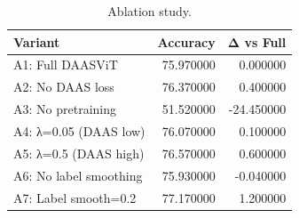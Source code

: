 \begin{table}
\caption{Ablation study.}
\label{tab:ablation}
\begin{tabular}{lrr}
\toprule
Variant & Accuracy & Δ vs Full \\
\midrule
A1: Full DAASViT & 75.970000 & 0.000000 \\
A2: No DAAS loss & 76.370000 & 0.400000 \\
A3: No pretraining & 51.520000 & -24.450000 \\
A4: λ=0.05 (DAAS low) & 76.070000 & 0.100000 \\
A5: λ=0.5  (DAAS high) & 76.570000 & 0.600000 \\
A6: No label smoothing & 75.930000 & -0.040000 \\
A7: Label smooth=0.2 & 77.170000 & 1.200000 \\
\bottomrule
\end{tabular}
\end{table}
